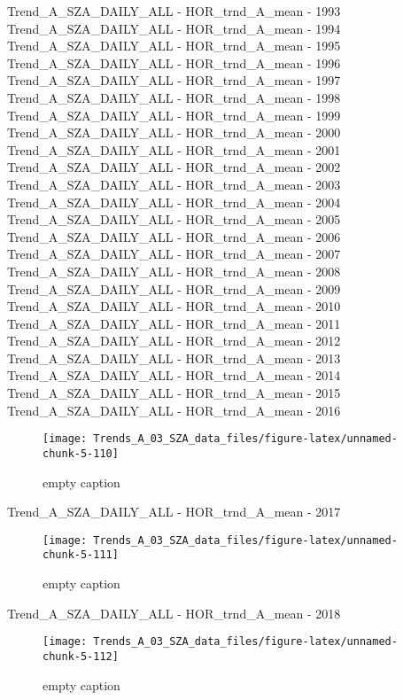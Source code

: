 \documentclass[
  10pt,
  a4paper,oneside]{article}
\begin{document}
Trend\_A\_SZA\_DAILY\_ALL - HOR\_trnd\_A\_mean - 1993
Trend\_A\_SZA\_DAILY\_ALL - HOR\_trnd\_A\_mean - 1994
Trend\_A\_SZA\_DAILY\_ALL - HOR\_trnd\_A\_mean - 1995
Trend\_A\_SZA\_DAILY\_ALL - HOR\_trnd\_A\_mean - 1996
Trend\_A\_SZA\_DAILY\_ALL - HOR\_trnd\_A\_mean - 1997
Trend\_A\_SZA\_DAILY\_ALL - HOR\_trnd\_A\_mean - 1998
Trend\_A\_SZA\_DAILY\_ALL - HOR\_trnd\_A\_mean - 1999
Trend\_A\_SZA\_DAILY\_ALL - HOR\_trnd\_A\_mean - 2000
Trend\_A\_SZA\_DAILY\_ALL - HOR\_trnd\_A\_mean - 2001
Trend\_A\_SZA\_DAILY\_ALL - HOR\_trnd\_A\_mean - 2002
Trend\_A\_SZA\_DAILY\_ALL - HOR\_trnd\_A\_mean - 2003
Trend\_A\_SZA\_DAILY\_ALL - HOR\_trnd\_A\_mean - 2004
Trend\_A\_SZA\_DAILY\_ALL - HOR\_trnd\_A\_mean - 2005
Trend\_A\_SZA\_DAILY\_ALL - HOR\_trnd\_A\_mean - 2006
Trend\_A\_SZA\_DAILY\_ALL - HOR\_trnd\_A\_mean - 2007
Trend\_A\_SZA\_DAILY\_ALL - HOR\_trnd\_A\_mean - 2008
Trend\_A\_SZA\_DAILY\_ALL - HOR\_trnd\_A\_mean - 2009
Trend\_A\_SZA\_DAILY\_ALL - HOR\_trnd\_A\_mean - 2010
Trend\_A\_SZA\_DAILY\_ALL - HOR\_trnd\_A\_mean - 2011
Trend\_A\_SZA\_DAILY\_ALL - HOR\_trnd\_A\_mean - 2012
Trend\_A\_SZA\_DAILY\_ALL - HOR\_trnd\_A\_mean - 2013
Trend\_A\_SZA\_DAILY\_ALL - HOR\_trnd\_A\_mean - 2014
Trend\_A\_SZA\_DAILY\_ALL - HOR\_trnd\_A\_mean - 2015
Trend\_A\_SZA\_DAILY\_ALL - HOR\_trnd\_A\_mean - 2016

\begin{figure}[!ht]

{\centering \texttt{[image: Trends\_A\_03\_SZA\_data\_files/figure-latex/unnamed-chunk-5-110]} 

}

\caption{ empty caption }\label{fig:unnamed-chunk-5-110}
\end{figure}

Trend\_A\_SZA\_DAILY\_ALL - HOR\_trnd\_A\_mean - 2017

\begin{figure}[!ht]

{\centering \texttt{[image: Trends\_A\_03\_SZA\_data\_files/figure-latex/unnamed-chunk-5-111]} 

}

\caption{ empty caption }\label{fig:unnamed-chunk-5-111}
\end{figure}

Trend\_A\_SZA\_DAILY\_ALL - HOR\_trnd\_A\_mean - 2018

\begin{figure}[!ht]

{\centering \texttt{[image: Trends\_A\_03\_SZA\_data\_files/figure-latex/unnamed-chunk-5-112]} 

}

\caption{ empty caption }\label{fig:unnamed-chunk-5-112}
\end{figure}
\end{document}
